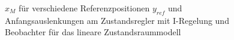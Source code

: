 \begin{figure}[H]
    \centering
    \caption[$x_M$ für Regler mit I-Regelung und Beobachter (linear)]{$x_M$ für verschiedene Referenzpositionen $y_{ref}$ und Anfangsauslenkungen am Zustandsregler mit I-Regelung und Beobachter für das lineare Zustandsraummodell}
    \label{fig:Bild54}
\end{figure}


